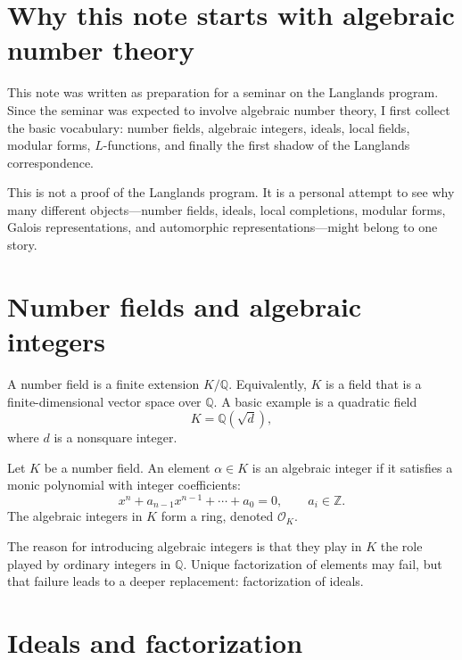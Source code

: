 
\section{Why this note starts with algebraic number theory}

This note was written as preparation for a seminar on the Langlands program.  Since the seminar was expected to involve algebraic number theory, I first collect the basic vocabulary: number fields, algebraic integers, ideals, local fields, modular forms, \(L\)-functions, and finally the first shadow of the Langlands correspondence.

\begin{remark}
This is not a proof of the Langlands program.  It is a personal attempt to see why many different objects---number fields, ideals, local completions, modular forms, Galois representations, and automorphic representations---might belong to one story.
\end{remark}

\section{Number fields and algebraic integers}

\begin{definition}
A number field is a finite extension \(K/\mathbb Q\).  Equivalently, \(K\) is a field that is a finite-dimensional vector space over \(\mathbb Q\).  A basic example is a quadratic field
\[
  K=\mathbb Q(\sqrt d),
\]
where \(d\) is a nonsquare integer.
\end{definition}

\begin{definition}
Let \(K\) be a number field.  An element \(\alpha\in K\) is an algebraic integer if it satisfies a monic polynomial with integer coefficients:
\[
  x^n+a_{n-1}x^{n-1}+\cdots+a_0=0,
  \qquad a_i\in\mathbb Z.
\]
The algebraic integers in \(K\) form a ring, denoted \(\mathcal O_K\).
\end{definition}

The reason for introducing algebraic integers is that they play in \(K\) the role played by ordinary integers in \(\mathbb Q\).  Unique factorization of elements may fail, but that failure leads to a deeper replacement: factorization of ideals.

\section{Ideals and factorization}

